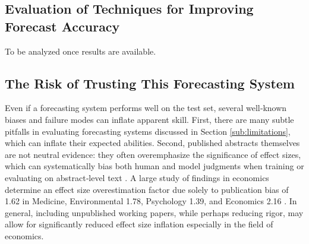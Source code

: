 \documentclass[12pt,a4paper]{article}
\begin{document}
\subsection{Evaluation of Techniques for Improving Forecast Accuracy} \label{sub:strengths_and_weaknesses_of_this_forecasting_system}
To be analyzed once results are available. %

\subsection{The Risk of Trusting This Forecasting System}
\label{subsec:risk_trusting_system}

Even if a forecasting system performs well on the test set, several well‐known biases and failure modes can inflate apparent skill. First, there are many subtle pitfalls in evaluating forecasting systems discussed in Section \ref{sub:limitations}, which can inflate their expected abilities. Second, published abstracts themselves are not neutral evidence: they often overemphasize the significance of effect sizes, which can systematically bias both human and model judgments when training or evaluating on abstract‐level text .  A large study of findings in economics determine an effect size overestimation factor due solely to publication bias of 1.62 in Medicine, Environmental 1.78, Psychology 1.39, and Economics 2.16 . %
In general, including unpublished working papers, while perhaps reducing rigor, may allow for significantly reduced effect size inflation especially in the field of economics.
\end{document}
